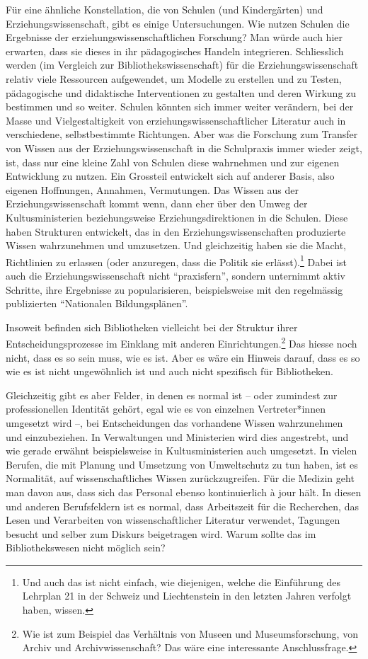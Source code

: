 \documentclass[a4paper,
fontsize=11pt,
oneside,
numbers=noperiodatend,
parskip=half-,
bibliography=totoc,
final
]{scrartcl}
\begin{document}
Für eine ähnliche Konstellation, die von Schulen (und Kindergärten) und
Erziehungswissenschaft, gibt es einige Untersuchungen. Wie nutzen
Schulen die Ergebnisse der erziehungswissenschaftlichen Forschung? Man
würde auch hier erwarten, dass sie dieses in ihr pädagogisches Handeln
integrieren. Schliesslich werden (im Vergleich zur
Bibliothekswissenschaft) für die Erziehungswissenschaft relativ viele
Ressourcen aufgewendet, um Modelle zu erstellen und zu Testen,
pädagogische und didaktische Interventionen zu gestalten und deren
Wirkung zu bestimmen und so weiter. Schulen könnten sich immer weiter
verändern, bei der Masse und Vielgestaltigkeit von
erziehungswissenschaftlicher Literatur auch in verschiedene,
selbstbestimmte Richtungen. Aber was die Forschung zum Transfer von
Wissen aus der Erziehungswissenschaft in die Schulpraxis immer wieder
zeigt, ist, dass nur eine kleine Zahl von Schulen diese wahrnehmen und
zur eigenen Entwicklung zu nutzen. Ein Grossteil entwickelt sich auf
anderer Basis, also eigenen Hoffnungen, Annahmen, Vermutungen. Das
Wissen aus der Erziehungswissenschaft kommt wenn, dann eher über den
Umweg der Kultusministerien beziehungsweise Erziehungsdirektionen in die
Schulen. Diese haben Strukturen entwickelt, das in den
Erziehungswissenschaften produzierte Wissen wahrzunehmen und umzusetzen.
Und gleichzeitig haben sie die Macht, Richtlinien zu erlassen (oder
anzuregen, dass die Politik sie erlässt).\footnote{Und auch das ist
  nicht einfach, wie diejenigen, welche die Einführung des Lehrplan 21
  in der Schweiz und Liechtenstein in den letzten Jahren verfolgt haben,
  wissen.} Dabei ist auch die Erziehungswissenschaft nicht
\enquote{praxisfern}, sondern unternimmt aktiv Schritte, ihre Ergebnisse
zu popularisieren, beispielsweise mit den regelmässig publizierten
\enquote{Nationalen Bildungsplänen}.

Insoweit befinden sich Bibliotheken vielleicht bei der Struktur ihrer
Entscheidungsprozesse im Einklang mit anderen Einrichtungen.\footnote{Wie
  ist zum Beispiel das Verhältnis von Museen und Museumsforschung, von
  Archiv und Archivwissenschaft? Das wäre eine interessante
  Anschlussfrage.} Das hiesse noch nicht, dass es so sein muss, wie es
ist. Aber es wäre ein Hinweis darauf, dass es so wie es ist nicht
ungewöhnlich ist und auch nicht spezifisch für Bibliotheken.

Gleichzeitig gibt es aber Felder, in denen es normal ist -- oder
zumindest zur professionellen Identität gehört, egal wie es von
einzelnen Vertreter*innen umgesetzt wird --, bei Entscheidungen das
vorhandene Wissen wahrzunehmen und einzubeziehen. In Verwaltungen und
Ministerien wird dies angestrebt, und wie gerade erwähnt beispielsweise
in Kultusministerien auch umgesetzt. In vielen Berufen, die mit Planung
und Umsetzung von Umweltschutz zu tun haben, ist es Normalität, auf
wissenschaftliches Wissen zurückzugreifen. Für die Medizin geht man
davon aus, dass sich das Personal ebenso kontinuierlich à jour hält. In
diesen und anderen Berufsfeldern ist es normal, dass Arbeitszeit für die
Recherchen, das Lesen und Verarbeiten von wissenschaftlicher Literatur
verwendet, Tagungen besucht und selber zum Diskurs beigetragen wird.
Warum sollte das im Bibliothekswesen nicht möglich sein?
\end{document}
